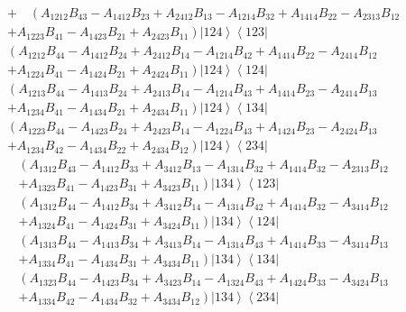 \documentclass[aps,preprint]{revtex4}%
\begin{document}
\begin{align}
&  +\quad\left(  A_{1212}B_{43}-A_{1412}B_{23}+A_{2412}B_{13}-A_{1214}%
B_{32}+A_{1414}B_{22}-A_{2313}B_{12}\right.  \nonumber\\
&  \left.  +A_{1223}B_{41}-A_{1423}B_{21}+A_{2423}B_{11}\right)  \left\vert
124\right\rangle \left\langle 123\right\vert \nonumber\\
&  \left(  A_{1212}B_{44}-A_{1412}B_{24}+A_{2412}B_{14}-A_{1214}%
B_{42}+A_{1414}B_{22}-A_{2414}B_{12}\right.  \nonumber\\
&  \left.  +A_{1224}B_{41}-A_{1424}B_{21}+A_{2424}B_{11}\right)  \left\vert
124\right\rangle \left\langle 124\right\vert \nonumber\\
&  \left(  A_{1213}B_{44}-A_{1413}B_{24}+A_{2413}B_{14}-A_{1214}%
B_{43}+A_{1414}B_{23}-A_{2414}B_{13}\right.  \nonumber\\
&  \left.  +A_{1234}B_{41}-A_{1434}B_{21}+A_{2434}B_{11}\right)  \left\vert
124\right\rangle \left\langle 134\right\vert \nonumber\\
&  \left(  A_{1223}B_{44}-A_{1423}B_{24}+A_{2423}B_{14}-A_{1224}%
B_{43}+A_{1424}B_{23}-A_{2424}B_{13}\right.  \nonumber\\
&  \left.  +A_{1234}B_{42}-A_{1434}B_{22}+A_{2434}B_{12}\right)  \left\vert
124\right\rangle \left\langle 234\right\vert
\end{align}%
\begin{align}
&  \left(  A_{1312}B_{43}-A_{1412}B_{33}+A_{3412}B_{13}-A_{1314}%
B_{32}+A_{1414}B_{32}-A_{2313}B_{12}\right.  \nonumber\\
&  \left.  +A_{1323}B_{41}-A_{1423}B_{31}+A_{3423}B_{11}\right)  \left\vert
134\right\rangle \left\langle 123\right\vert \nonumber\\
&  \left(  A_{1312}B_{44}-A_{1412}B_{34}+A_{3412}B_{14}-A_{1314}%
B_{42}+A_{1414}B_{32}-A_{3414}B_{12}\right.  \nonumber\\
&  \left.  +A_{1324}B_{41}-A_{1424}B_{31}+A_{3424}B_{11}\right)  \left\vert
134\right\rangle \left\langle 124\right\vert \nonumber\\
&  \left(  A_{1313}B_{44}-A_{1413}B_{34}+A_{3413}B_{14}-A_{1314}%
B_{43}+A_{1414}B_{33}-A_{3414}B_{13}\right.  \nonumber\\
&  \left.  +A_{1334}B_{41}-A_{1434}B_{31}+A_{3434}B_{11}\right)  \left\vert
134\right\rangle \left\langle 134\right\vert \nonumber\\
&  \left(  A_{1323}B_{44}-A_{1423}B_{34}+A_{3423}B_{14}-A_{1324}%
B_{43}+A_{1424}B_{33}-A_{3424}B_{13}\right.  \nonumber\\
&  \left.  +A_{1334}B_{42}-A_{1434}B_{32}+A_{3434}B_{12}\right)  \left\vert
134\right\rangle \left\langle 234\right\vert
\end{align}%
\end{document}
